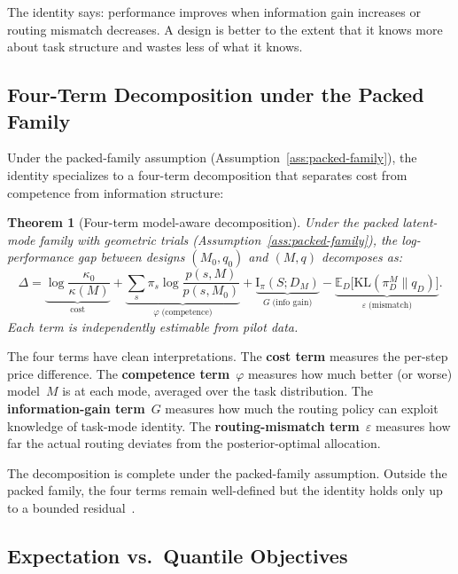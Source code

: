 \documentclass[twoside,11pt]{article}
\newtheorem{theorem}{Theorem}
\newcommand{\KL}{\mathrm{KL}}
\newcommand{\E}{\mathbb{E}}
\newcommand{\MI}{\mathrm{I}}
\newcommand{\mismatch}{\varepsilon}
\begin{document}
The identity says: performance improves when information gain increases or routing mismatch decreases.  A design is better to the extent that it knows more about task structure and wastes less of what it knows.

\subsection{Four-Term Decomposition under the Packed Family}
\label{sec:four-term}

Under the packed-family assumption (Assumption~\ref{ass:packed-family}), the identity specializes to a four-term decomposition that separates cost from competence from information structure:

\begin{theorem}[Four-term model-aware decomposition]
\label{thm:four-term}
Under the packed latent-mode family with geometric trials (Assumption~\ref{ass:packed-family}), the log-performance gap between designs $(M_0, q_0)$ and $(M, q)$ decomposes as:
\begin{equation}
\label{eq:four-term}
  \Delta = \underbrace{\log\frac{\kappa_0}{\kappa(M)}}_{\text{cost}}
  + \underbrace{\sum_s \pi_s \log\frac{p(s, M)}{p(s, M_0)}}_{\varphi\;\text{(competence)}}
  + \underbrace{\MI_\pi(S; D_M)}_{G\;\text{(info gain)}}
  - \underbrace{\E_D\bigl[\KL(\pi_D^M \| q_D)\bigr]}_{\mismatch\;\text{(mismatch)}}.
\end{equation}
Each term is independently estimable from pilot data.
\end{theorem}

The four terms have clean interpretations.
The \textbf{cost term} measures the per-step price difference.
The \textbf{competence term}~$\varphi$ measures how much better (or worse) model~$M$ is at each mode, averaged over the task distribution.
The \textbf{information-gain term}~$G$ measures how much the routing policy can exploit knowledge of task-mode identity.
The \textbf{routing-mismatch term}~$\mismatch$ measures how far the actual routing deviates from the posterior-optimal allocation.

The decomposition is complete under the packed-family assumption.
Outside the packed family, the four terms remain well-defined but the identity holds only up to a bounded residual~\citep{beneventano2026framework}.

\subsection{Expectation vs.\ Quantile Objectives}
\label{sec:quantile-scoping}
\end{document}
